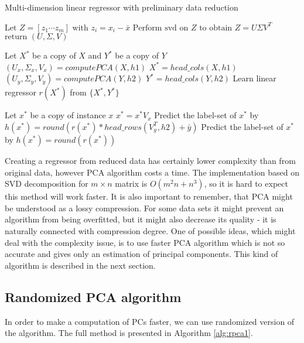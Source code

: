 \begin{algorithm}
    \caption{Multi-dimension linear regressor with preliminary data reduction}\label{alg:pca1}
    \begin{algorithmic}[1]
        \State $\text{Let } Z=[z_1 \cdots z_m] \text{ with } z_i = x_i-\bar{x}$
        \State $\text{Perform svd on } Z \text{ to obtain } Z = U\Sigma{V^T}$
        \State $\text{return } (U,\Sigma,V)$
    \EndFunction
    \item[] 
    \State Let $X^{*}$ be a copy of $X$ and $Y^{*}$ be a copy of $Y$
        \State $(U_x, \Sigma_{x}, V_x) = computePCA(X,h1)$
        \State $X^{*}=head\_cols(X, h1)$
    \EndIf
        \State $(U_y, \Sigma_{y}, V_y) = computePCA(Y,h2)$
        \State $Y^{*}=head\_cols(Y, h2)$
    \EndIf
    \State Learn linear regressor $r(X^*)$ from $\{X^*,Y^*\}$
    \item[]
    \State Let $x^*$ be a copy of instance $x$
        \State $x^* = x^*V_x$
    \EndIf
        \State Predict the label-set of $x^*$ by $h(x^*)=round( r(x^*) * head\_rows(V_y^T, h2) + \bar{y})$ 
    \Else
        \State Predict the label-set of $x^*$ by $h(x^*)=round( r(x^*) )$ 
    \EndIf

    \end{algorithmic}
\end{algorithm}

Creating a regressor from reduced data has certainly lower complexity than from original data, however PCA algorithm costs a time. The implementation based on SVD decomposition for $m\times{n}$ matrix is $O(m^2n + n^3)$, so it is hard to expect this method will work faster. It is also important to remember, that PCA might be understood as a lossy compression. For some data sets it might prevent an algorithm from being overfitted, but it might also decrease its quality - it is naturally connected with compression degree. 
One of possible ideas, which might deal with the complexity issue, is to use faster PCA algorithm which is not so accurate and gives only an estimation of principal components. This kind of algorithm is described in the next section.

\subsection{Randomized PCA algorithm}

In order to make a computation of PCs faster, we can use randomized version of the algorithm. The full method is presented in Algorithm \ref{alg:rpca1}. 

